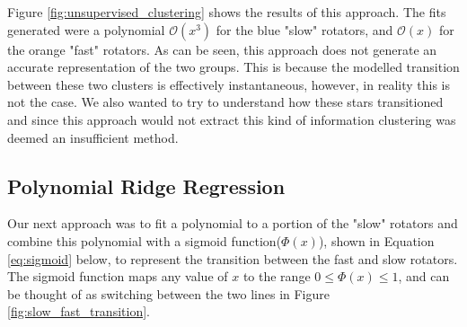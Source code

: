 \documentclass[fleqn,usenatbib]{mnras}
\begin{document}
Figure \ref{fig:unsupervised_clustering} shows the results of this approach.
The fits generated were a polynomial $\mathcal{O}(x^3)$ for the blue "slow" rotators, and $\mathcal{O}(x)$ for the orange "fast" rotators.
As can be seen, this approach does not generate an accurate representation of the two groups.
This is because the modelled transition between these two clusters is effectively instantaneous, however, in reality this is not the case.
We also wanted to try to understand how these stars transitioned and since this approach would not extract this kind of information clustering was deemed an insufficient method.

\subsection{Polynomial Ridge Regression}
Our next approach was to fit a polynomial to a portion of the "slow" rotators and combine this polynomial with a sigmoid function($\Phi\left(x\right)$), shown in Equation \ref{eq:sigmoid} below, to represent the transition between the fast and slow rotators.
The sigmoid function maps any value of $x$ to the range $ 0 \leq \Phi\left(x\right) \leq 1$, and can be thought of as switching between the two lines in Figure \ref{fig:slow_fast_transition}.
\end{document}
